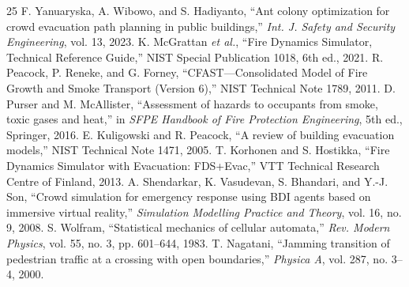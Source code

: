 ﻿\documentclass[conference]{IEEEtran}
\begin{document}
\begin{thebibliography}{25}
 F. Yanuaryska, A. Wibowo, and S. Hadiyanto, ``Ant colony optimization for crowd evacuation path planning in public buildings,'' \emph{Int. J. Safety and Security Engineering}, vol. 13, 2023.
 K. McGrattan \emph{et al.}, ``Fire Dynamics Simulator, Technical Reference Guide,'' NIST Special Publication 1018, 6th ed., 2021.
 R. Peacock, P. Reneke, and G. Forney, ``CFAST---Consolidated Model of Fire Growth and Smoke Transport (Version 6),'' NIST Technical Note 1789, 2011.
 D. Purser and M. McAllister, ``Assessment of hazards to occupants from smoke, toxic gases and heat,'' in \emph{SFPE Handbook of Fire Protection Engineering}, 5th ed., Springer, 2016.
 E. Kuligowski and R. Peacock, ``A review of building evacuation models,'' NIST Technical Note 1471, 2005.
 T. Korhonen and S. Hostikka, ``Fire Dynamics Simulator with Evacuation: FDS+Evac,'' VTT Technical Research Centre of Finland, 2013.
 A. Shendarkar, K. Vasudevan, S. Bhandari, and Y.-J. Son, ``Crowd simulation for emergency response using BDI agents based on immersive virtual reality,'' \emph{Simulation Modelling Practice and Theory}, vol. 16, no. 9, 2008.
 S. Wolfram, ``Statistical mechanics of cellular automata,'' \emph{Rev. Modern Physics}, vol. 55, no. 3, pp. 601--644, 1983.
 T. Nagatani, ``Jamming transition of pedestrian traffic at a crossing with open boundaries,'' \emph{Physica A}, vol. 287, no. 3--4, 2000.

\end{thebibliography}
\end{document}
